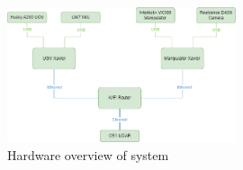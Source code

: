 \begin{figure}[H]
  \centering
  \includegraphics[width = 0.6\textwidth]{Figures/example_figure.drawio.png}
  \caption{Hardware overview of system}
  \label{fig:hardware_overview}
\end{figure}
